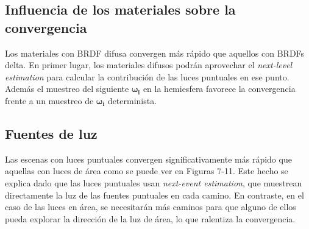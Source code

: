 \documentclass{article}
\begin{document}
\subsection{Influencia de los materiales sobre la convergencia}

Los materiales con BRDF difusa convergen más rápido que aquellos con BRDFs
delta. En primer lugar, los materiales difusos podrán aprovechar el
\textit{next-level estimation} para calcular la contribución de las luces
puntuales en ese punto. Además el muestreo del siguiente \(\mathbf{\omega_{i}}\)
en la hemiesfera favorece la convergencia frente a un muestreo de
\(\mathbf{\omega_{i}}\) determinista.

\subsection{Fuentes de luz}
Las escenas con luces puntuales convergen significativamente más rápido que
aquellas con luces de área como se puede ver en Figuras 7-11. Este hecho se
explica dado que las luces puntuales usan \textit{next-event estimation}, que
muestrean directamente la luz de las fuentes puntuales en cada camino. En
contraste, en el caso de las luces en área, se necesitarán más caminos para que
alguno de ellos pueda explorar la dirección de la luz de área, lo que ralentiza
la convergencia.
\end{document}

